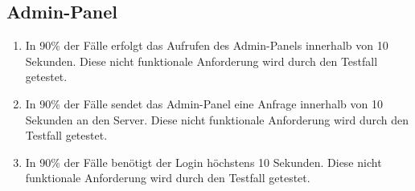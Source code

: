 \subsection*{Admin-Panel}

\begin{samepage}
    \begin{enumerate}[label=\textbf{/NFL\arabic*0/}, align=left, start=9]
        \item \label{/NFL90/} In 90\% der Fälle erfolgt das Aufrufen des \Gls{Admin-Panel}s innerhalb von 10 Sekunden. Diese nicht funktionale Anforderung wird durch den Testfall  getestet.
        \item \label{/NFL100/} In 90\% der Fälle sendet das \Gls{Admin-Panel} eine Anfrage innerhalb von 10 Sekunden an den \Gls{Server}. Diese nicht funktionale Anforderung wird durch den Testfall  getestet.
        \item \label{/NFL110/} In 90\% der Fälle benötigt der \Gls{Login} höchstens 10 Sekunden. Diese nicht funktionale Anforderung wird durch den Testfall  getestet.
    \end{enumerate}
\end{samepage}